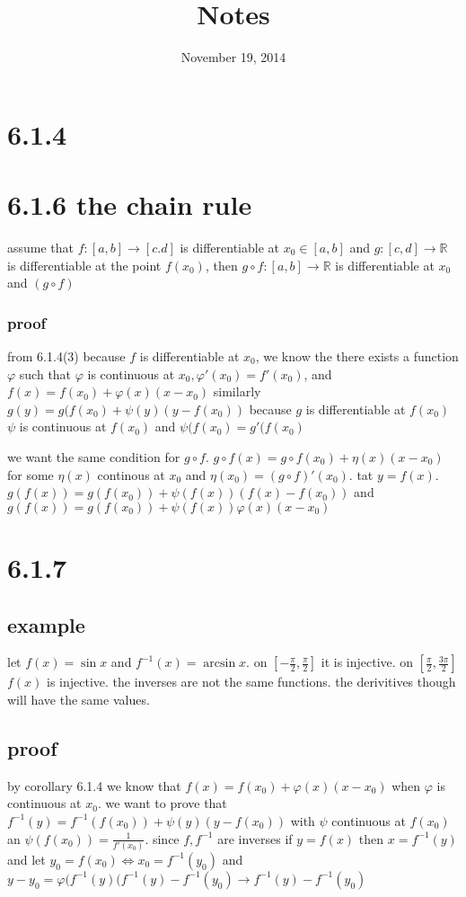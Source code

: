 \documentclass[letterpaper]{article}
\begin{document}
\title{Notes}
\date{November 19, 2014}
\maketitle
\section*{6.1.4}
\section*{6.1.6 the chain rule}
assume that $f:[a,b]\to[c.d]$ is differentiable at $x_0\in[a,b]$ and $g:[c,d]\to\mathbb{R}$ is differentiable at the point $f(x_0)$, then $g\circ f:[a,b]\to \mathbb{R}$ is differentiable at $x_0$ and $(g\circ f)$

\subsubsection*{proof}
from 6.1.4(3) because $f$ is differentiable at $x_0$, we know the there exists a function $\varphi$ such that $\varphi$ is continuous at $x_0, \varphi'(x_0)=f'(x_0)$, and $f(x)=f(x_0)+\varphi(x)(x-x_0)$ similarly $g(y)=g(f(x_0)+\psi(y)(y-f(x_0))$ because $g$ is differentiable at $f(x_0)$ $\psi$ is continuous at $f(x_0)$ and $\psi(f(x_0)=g'(f(x_0)$

we want the same condition for $g\circ f$. $g\circ f(x)=g\circ f(x_0)+\eta  (x)(x-x_0)$ for some $\eta(x)$ continous at $x_0$ and $\eta(x_0)=(g\circ f)'(x_0)$. tat $y=f(x)$. $g(f(x))=g(f(x_0))+\psi(f(x))(f(x)-f(x_0))$ and $g(f(x))=g(f(x_0))+\psi(f(x))\varphi(x)(x-x_0)$ 

\section*{6.1.7}
\subsection*{example}
let $f(x)=\sin x$ and $f^{-1}(x)=\arcsin x$. on $[-\frac{\pi}{2},\frac{\pi}{2}]$ it is injective. on $[\frac{\pi}{2},\frac{3\pi}{2}]$ $f(x)$ is injective. the inverses are not the same functions. the derivitives though will have the same values.
\subsection*{proof}
by corollary 6.1.4 we know that $f(x)=f(x_0)+\varphi(x)(x-x_0)$ when $\varphi$ is continuous at $x_0$. we want to prove that $f^{-1}(y)=f^{-1}(f(x_0))+\psi(y)(y-f(x_0))$ with $\psi$ continuous at $f(x_0)$ an $\psi(f(x_0))=\frac{1}{f'(x_0)}$. since $f,f^{-1}$ are inverses if $y=f(x)$ then $x=f^{-1}(y)$ and let $y_0=f(x_0)\Leftrightarrow x_0=f^{-1}(y_0)$ and $y-y_0=\varphi(f^{-1}(y)(f^{-1}(y)-f^{-1}(y_0)\to f^{-1}(y)-f^{-1}(y_0)$
\end{document}
